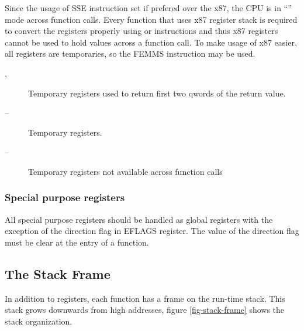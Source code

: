 Since the usage of SSE instruction set if prefered over the x87, the CPU is in
``\MMX'' mode across function calls. Every function that uses x87 register
stack is required to convert the registers properly using  or 
instructions and thus x87 registers cannot be used to hold values across a
function call.  To make usage of x87 easier, all \MMX{} registers are temporaries,
so the FEMMS instruction may be used.
\begin{description}
  \item [, ] Temporary registers used to return first two qwords of the return value.
  \item [ -- ] Temporary registers.
  \item [ -- ] Temporary registers not available across function calls
\end{description}


\subsubsection {Special purpose registers}
All special purpose registers should be handled as global registers
with the exception of the direction flag in EFLAGS register.  The
value of the direction flag must be clear at the entry of a function.

\subsection{The Stack Frame}
In addition to registers, each function has a frame on the run-time stack.  This
stack grows downwards from high addresses, figure \ref{fig-stack-frame} shows the
stack organization.


